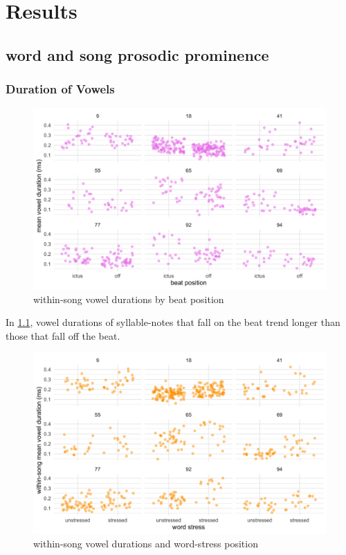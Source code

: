 \chapter{Results}
%


\section{word and song prosodic prominence}


\subsection{Duration of Vowels}


\begin{figure}[htb]
\begin{center}
\includegraphics[width=\textwidth]{figures/song_ick_dur.png}

\caption{within-song vowel durations by beat position}
\label{songick}
\end{center}
\end{figure}
In \ref{songick}, vowel durations of syllable-notes that fall on the beat trend longer than those that fall off the beat. 
\begin{figure}[htb]
\begin{center}
\includegraphics[width=\textwidth]{figures/song_str_dur.png}

\caption{within-song vowel durations and word-stress position}
\label{songstr}
\end{center}
\end{figure}
